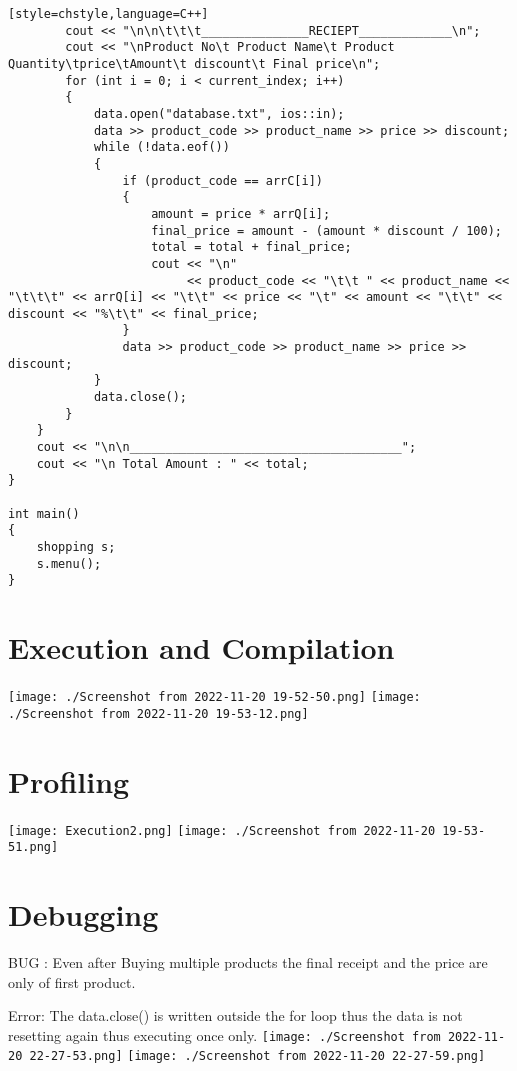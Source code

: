 \documentclass{article}
\begin{document}
\begin{verbatim}[style=chstyle,language=C++]
        cout << "\n\n\t\t\t_______________RECIEPT_____________\n";
        cout << "\nProduct No\t Product Name\t Product Quantity\tprice\tAmount\t discount\t Final price\n";
        for (int i = 0; i < current_index; i++)
        {
            data.open("database.txt", ios::in);
            data >> product_code >> product_name >> price >> discount;
            while (!data.eof())
            {
                if (product_code == arrC[i])
                {
                    amount = price * arrQ[i];
                    final_price = amount - (amount * discount / 100);
                    total = total + final_price;
                    cout << "\n"
                         << product_code << "\t\t " << product_name << "\t\t\t" << arrQ[i] << "\t\t" << price << "\t" << amount << "\t\t" << discount << "%\t\t" << final_price;
                }
                data >> product_code >> product_name >> price >> discount;
            }
            data.close();
        }
    }
    cout << "\n\n______________________________________";
    cout << "\n Total Amount : " << total;
}

int main()
{
    shopping s;
    s.menu();
}
\end{verbatim}

\section{Execution and Compilation}

\texttt{[image: ./Screenshot from 2022-11-20 19-52-50.png]} 
\texttt{[image: ./Screenshot from 2022-11-20 19-53-12.png]} 
\section{Profiling}
\texttt{[image: Execution2.png]} 
\texttt{[image: ./Screenshot from 2022-11-20 19-53-51.png]} 
\section{Debugging}
BUG : Even after Buying multiple products the final receipt and
      the price are only of first product.
      
Error: The data.close() is written outside the for loop thus the           data is not resetting again thus executing once only.
\texttt{[image: ./Screenshot from 2022-11-20 22-27-53.png]}    
\texttt{[image: ./Screenshot from 2022-11-20 22-27-59.png]} 

    
 
\end{document}
